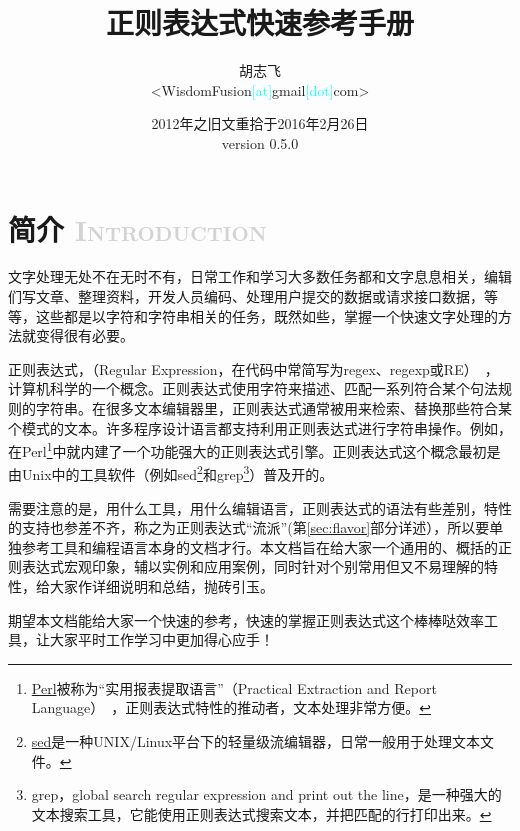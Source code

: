 \documentclass[12pt,a4paper,twoside]{ctexart}
\begin{document}
\title{\textbf{正则表达式快速参考手册}}
\author{胡志飞\\<WisdomFusion\textcolor{cyan}{\small [at]}gmail\textcolor{cyan}{\small [dot]}com>}
\date{\color{OrangeRed}2012年之旧文重拾于2016年2月26日\\version 0.5.0}

\maketitle{}
\thispagestyle{empty}
\clearpage{}

\begin{multicols}{2}
\tableofcontents
\end{multicols}

\thispagestyle{empty}
\clearpage{}

\setcounter{page}{1}

\section[简介]{简介 \textcolor{lightgray}{\textsc{Introduction}}}
\label{sec:intro}
文字处理无处不在无时不有，日常工作和学习大多数任务都和文字息息相关，编辑们写文章、整理资料，开发人员编码、处理用户提交的数据或请求接口数据，等等，这些都是以字符和字符串相关的任务，既然如些，掌握一个快速文字处理的方法就变得很有必要。\par
正则表达式，（Regular Expression，在代码中常简写为regex、regexp或RE）~，计算机科学的一个概念。正则表达式使用字符来描述、匹配一系列符合某个句法规则的字符串。在很多文本编辑器里，正则表达式通常被用来检索、替换那些符合某个模式的文本。许多程序设计语言都支持利用正则表达式进行字符串操作。例如，在Perl\footnote{\href{https://www.perl.org/}{Perl}被称为“实用报表提取语言”（Practical Extraction and Report Language）~，正则表达式特性的推动者，文本处理非常方便。}中就内建了一个功能强大的正则表达式引擎。正则表达式这个概念最初是由Unix中的工具软件（例如sed\footnote{\href{http://www.gnu.org/software/sed/manual/sed.html}{sed}是一种UNIX/Linux平台下的轻量级流编辑器，日常一般用于处理文本文件。}和grep\footnote{grep，global search regular expression and print out the line，是一种强大的文本搜索工具，它能使用正则表达式搜索文本，并把匹配的行打印出来。}）普及开的。\par
需要注意的是，用什么工具，用什么编辑语言，正则表达式的语法有些差别，特性的支持也参差不齐，称之为正则表达式“流派”(第\ref{sec:flavor}部分详述），所以要单独参考工具和编程语言本身的文档才行。本文档旨在给大家一个通用的、概括的正则表达式宏观印象，辅以实例和应用案例，同时针对个别常用但又不易理解的特性，给大家作详细说明和总结，抛砖引玉。\par
期望本文档能给大家一个快速的参考，快速的掌握正则表达式这个棒棒哒效率工具，让大家平时工作学习中更加得心应手！\Smiley{} \vspace{2ex}\par
\end{document}
